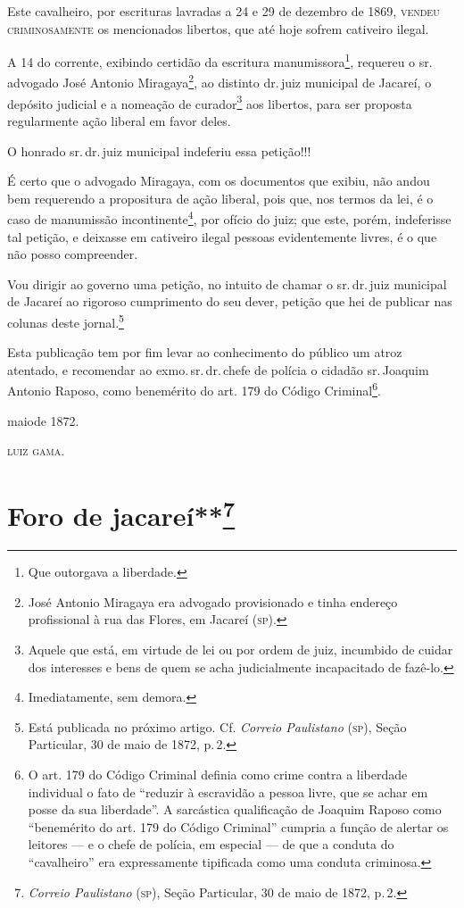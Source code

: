 Este cavalheiro, por escrituras lavradas a 24 e 29 de dezembro de 1869,
\textsc{vendeu} \textsc{criminosamente} os mencionados libertos, que até hoje sofrem
cativeiro ilegal.

A 14 do corrente, exibindo certidão da escritura manumissora\footnote{
  Que outorgava a liberdade.}, requereu o sr.\,advogado José Antonio
Miragaya\footnote{ José Antonio Miragaya era advogado provisionado e
  tinha endereço profissional à rua das Flores, em Jacareí (\textsc{sp}).}, ao
distinto dr.\,juiz municipal de Jacareí, o depósito judicial e a nomeação
de curador\footnote{ Aquele que está, em virtude de lei ou por ordem de
  juiz, incumbido de cuidar dos interesses e bens de quem se acha
  judicialmente incapacitado de fazê-lo.} aos libertos, para ser
proposta regularmente ação liberal em favor deles.

O honrado sr.\,dr.\,juiz municipal indeferiu essa petição!!!

É certo que o advogado Miragaya, com os documentos que exibiu, não andou
bem requerendo a propositura de ação liberal, pois que, nos termos da
lei, é o caso de manumissão incontinente\footnote{ Imediatamente, sem
  demora.}, por ofício do juiz; que este, porém, indeferisse tal
petição, e deixasse em cativeiro ilegal pessoas evidentemente livres, é
o que não posso compreender.

Vou dirigir ao governo uma petição, no intuito de chamar o sr.\,dr.\,juiz
municipal de Jacareí ao rigoroso cumprimento do seu dever, petição que
hei de publicar nas colunas deste jornal.\footnote{ Está publicada no
  próximo artigo. Cf. \emph{Correio Paulistano} (\textsc{sp}), Seção Particular,
  30 de maio de 1872, p.\,2.}

Esta publicação tem por fim levar ao conhecimento do público um atroz
atentado, e recomendar ao exmo.\,sr.\,dr.\,chefe de polícia o cidadão sr.\,Joaquim Antonio Raposo, como benemérito do art. 179 do Código
Criminal\footnote{ O art. 179 do Código Criminal definia como crime
  contra a liberdade individual o fato de ``reduzir à escravidão a pessoa
  livre, que se achar em posse da sua liberdade''. A sarcástica
  qualificação de Joaquim Raposo como ``benemérito do art. 179 do Código
  Criminal'' cumpria a função de alertar os leitores --- e o chefe de
  polícia, em especial --- de que a conduta do ``cavalheiro'' era
  expressamente tipificada como uma conduta criminosa.}.

maiode 1872.

\textsc{luiz gama}.

\chapter{Foro de jacareí**\footnote{\emph{Correio Paulistano} (\textsc{sp}), Seção Particular,
  30 de maio de 1872, p.\,2.} } %

